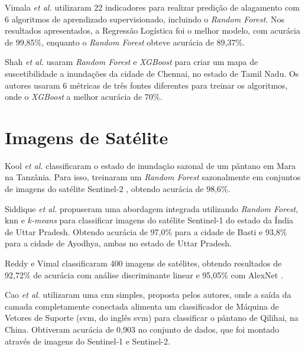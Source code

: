 Vimala \textit{et al.} \cite{vimala2024} utilizaram 22 indicadores para realizar predição de alagamento com 6 algoritmos de aprendizado supervisionado, incluindo o \textit{Random Forest}.
Nos resultados apresentados, a Regressão Logística \cite{cramerlogisticregression} foi o melhor modelo, com acurácia de 99,85\%, enquanto o \textit{Random Forest} obteve acurácia de 89,37\%.

Shah \textit{et al.} \cite{shah2024} usaram \textit{Random Forest} e \textit{XGBoost} \cite{chenxgboost} para criar um mapa de suscetibilidade a inundações da cidade de Chennai, no estado de Tamil Nadu.
Os autores usaram 6 métricas de três fontes diferentes para treinar os algoritmos, onde o \textit{XGBoost} a melhor acurácia de 70\%.


\section{Imagens de Satélite}

Kool \textit{et al.} \cite{KOOL2022102766} classificaram o estado de inundação sazonal de um pântano em Mara na Tanzânia. 
Para isso, treinaram um \textit{Random Forest} sazonalmente em conjuntos de imagens do satélite Sentinel-2 \cite{sentinel2}, obtendo acurácia de 98,6\%.

Siddique \textit{et al.} \cite{siddique2023} propuseram uma abordagem integrada utilizando \textit{Random Forest}, \acrfull{knn}\cite{knn1967} e \textit{k-means}\cite{kmeans2023} 
para classificar imagens do satélite Sentinel-1 \cite{sentinel1} do estado da Índia de Uttar Pradesh. Obtendo acurácia de 97,0\% para a cidade de Basti e 93,8\% para a cidade de Ayodhya, ambas no estado de Uttar Pradesh.


Reddy e Vimal \cite{reddy2024} classificaram 400 imagens de satélites, obtendo resultados de 92,72\% de acurácia com análise discriminante linear \cite{lda} e 95,05\% com AlexNet \cite{alexnet}.

Cao \textit{et al.} \cite{cao2024} utilizaram uma \acrshort{cnn} simples, proposta pelos autores, onde a saída da camada completamente conectada alimenta um 
classificador de Máquina de Vetores de Suporte (\acrshort{svm}, do inglês \acrlong{svm}) \cite{svm} para classificar o pântano de Qilihai, na China. Obtiveram acurácia de 0,903 no conjunto de dados,
que foi montado através de imagens do Sentinel-1 e Sentinel-2.


